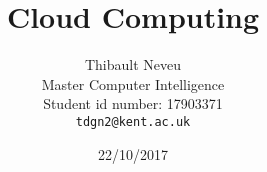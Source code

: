 
\title{Cloud Computing}
\author{Thibault Neveu \\
  Master Computer Intelligence \\
  Student id number: 17903371 \\
  {\tt tdgn2@kent.ac.uk}}

\date{22/10/2017}
